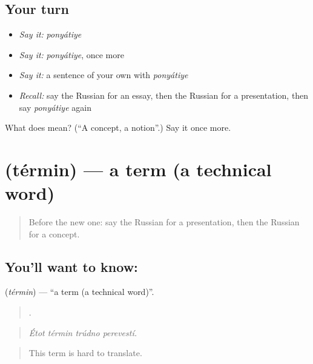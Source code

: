\subsection*{Your turn}
\begin{itemize}
\raggedright
  \item \emph{Say it:} \emph{ponyátiye}
  \item \emph{Say it:} \emph{ponyátiye}, once more
  \item \emph{Say it:} a sentence of your own with \emph{ponyátiye}
  \item \emph{Recall:} say the Russian for an essay, then the Russian for a presentation, then say \emph{ponyátiye} again
\end{itemize}

\begin{tcolorbox}[breakable,colback=teal!4,colframe=teal!35!black,title={Before you move on}]
What does  mean? (\textquotedblleft{}A concept, a notion\textquotedblright{}.) Say it once more.
\end{tcolorbox}
\section[\texorpdfstring{\ru{термин} (términ)}{термин (términ)}]{ (términ) — a term (a technical word)}

\label{lesson:RU-C386-termin}



\begin{quote}
Before the new one: say the Russian for a presentation, then the Russian for a concept.
\end{quote}

\subsection*{You'll want to know: }
\textbf{} (\emph{términ}) — \textquotedblleft{}a term (a technical word)\textquotedblright{}.

\begin{quote}
   .
\end{quote}

\begin{quote}
\emph{Étot términ trúdno perevestí.}
\end{quote}

\begin{quote}
This term is hard to translate.
\end{quote}

